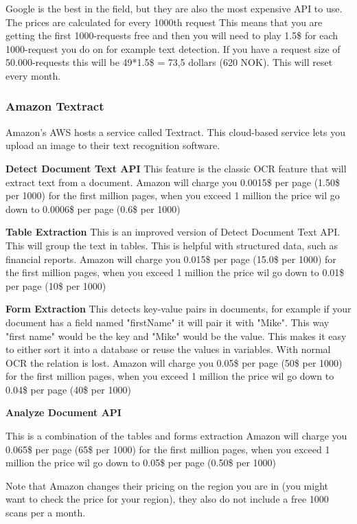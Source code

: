 Google is the best in the field, but they are also the most expensive API to use.
The prices are calculated for every 1000th request
This means that you are getting the first 1000-requests free and then you will need to play 1.5\$ for each 1000-request you do on for example text detection.
If you have a request size of 50.000-requests this will be 49*1.5\$ = 73,5 dollars (620 NOK).
This will reset every month.

\subsubsection{Amazon Textract}\label{subsubsec:API_Amazon}

Amazon's AWS hosts a service called Textract.
This cloud-based service lets you upload an image to their text recognition software.

\textbf{Detect Document Text API}
This feature is the classic OCR feature that will extract text from a document.
Amazon will charge you 0.0015\$ per page (1.50\$ per 1000) for the first million pages, when you exceed 1 million the price wil go down to
0.0006\$ per page (0.6\$ per 1000)

\textbf{Table Extraction}
This is an improved version of Detect Document Text API. This will group the text in tables.
This is helpful with structured data, such as financial reports.
Amazon will charge you 0.015\$ per page (15.0\$ per 1000) for the first million pages, when you exceed 1 million the price wil go down to
0.01\$ per page (10\$ per 1000)

\textbf{Form Extraction}
This detects key-value pairs in documents, for example if your document has a field named "firstName" it will pair
it with "Mike".
This way "first name" would be the key and "Mike" would be the value.
This makes it easy to either sort it into a database or reuse the values in variables.
With normal OCR the relation is lost.
Amazon will charge you 0.05\$ per page (50\$ per 1000) for the first million pages, when you exceed 1 million the price wil go down to
0.04\$ per page (40\$ per 1000)

\textbf{Analyze Document API}

This is a combination of the tables and forms extraction
Amazon will charge you 0.065\$ per page (65\$ per 1000) for the first million pages, when you exceed 1 million the price wil go down to
0.05\$ per page (0.50\$ per 1000)

Note that Amazon changes their pricing on the region you are in (you might want to check the price for your region), they also do not include a free 1000 scans per a month.

